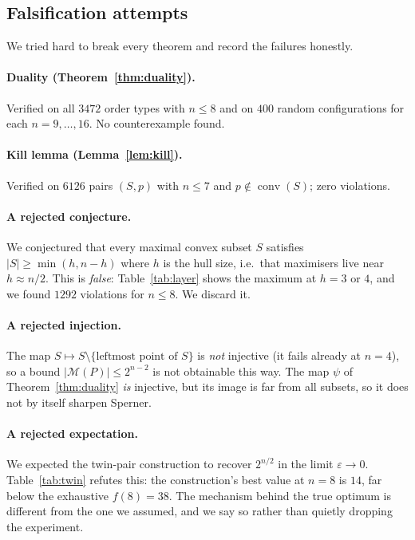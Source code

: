 \documentclass[11pt,a4paper]{article}
\theoremstyle{definition}
\newcommand{\conv}{\operatorname{conv}}
\newcommand{\M}{\mathcal{M}}
\begin{document}
\subsection{Falsification attempts}

We tried hard to break every theorem and record the failures honestly.

\paragraph{Duality (Theorem~\ref{thm:duality}).} Verified on all $3472$ order types
with $n\le 8$ and on $400$ random configurations for each $n=9,\dots,16$.  No
counterexample found.

\paragraph{Kill lemma (Lemma~\ref{lem:kill}).} Verified on $6126$ pairs $(S,p)$ with
$n\le 7$ and $p\notin\conv(S)$; zero violations.

\paragraph{A rejected conjecture.} We conjectured that every maximal convex subset
$S$ satisfies $|S|\ge\min(h,n-h)$ where $h$ is the hull size, i.e.\ that maximisers
live near $h\approx n/2$.  This is \emph{false}: Table~\ref{tab:layer} shows the
maximum at $h=3$ or $4$, and we found $1292$ violations for $n\le 8$.  We discard
it.

\paragraph{A rejected injection.} The map $S\mapsto S\setminus\{\text{leftmost point of } S\}$
is \emph{not} injective (it fails already at $n=4$), so a bound
$|\M(P)|\le 2^{n-2}$ is not obtainable this way.  The map $\psi$ of
Theorem~\ref{thm:duality} \emph{is} injective, but its image is far from all
subsets, so it does not by itself sharpen Sperner.

\paragraph{A rejected expectation.} We expected the twin-pair construction to
recover $2^{n/2}$ in the limit $\varepsilon\to0$.  Table~\ref{tab:twin} refutes
this: the construction's best value at $n=8$ is $14$, far below the exhaustive
$f(8)=38$.  The mechanism behind the true optimum is different from the one we
assumed, and we say so rather than quietly dropping the experiment.
\end{document}
